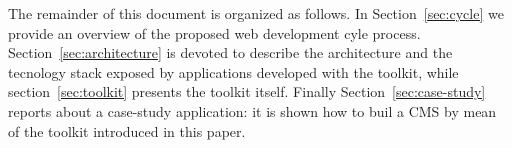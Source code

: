 
The remainder of this document is organized as follows. In Section~\ref{sec:cycle} we provide an overview of the proposed web development cyle process. Section~\ref{sec:architecture} is devoted to describe the architecture and the tecnology stack exposed by applications developed with the toolkit, while section~\ref{sec:toolkit} presents the toolkit itself. Finally Section~\ref{sec:case-study} reports about a case-study application: it is shown how to buil a CMS by mean of the toolkit introduced in this paper.%

